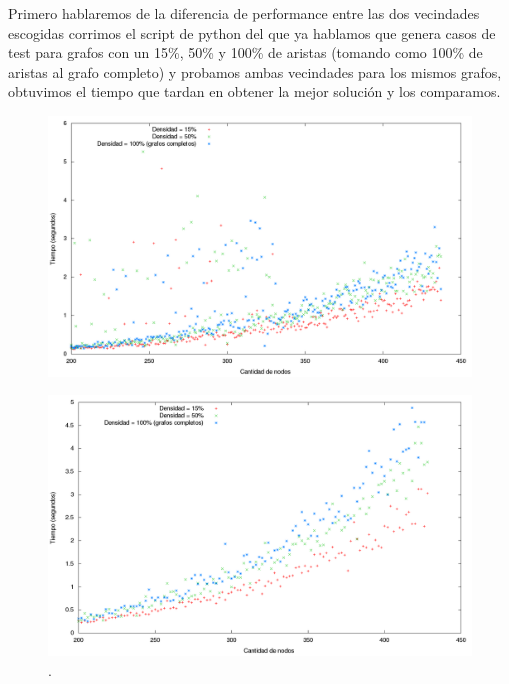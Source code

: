 Primero hablaremos de la diferencia de performance entre las dos vecindades escogidas corrimos el script de python del que ya hablamos que genera casos de test para grafos con un 15\%, 50\% y 100\% de aristas (tomando como 100\% de aristas al grafo completo) y probamos ambas vecindades para los mismos grafos, obtuvimos el tiempo que tardan en obtener la mejor solución y los comparamos.

\begin{figure}[H]
\begin{center}
\includegraphics[scale=0.4]{./img/PerformanceLocal1.png}
\caption{}
\end{center}
\end{figure}

\begin{figure}[H]
\begin{center}
\includegraphics[scale=0.4]{./img/PerformanceLocal2.png}
\caption{.}
\end{center}
\end{figure}

